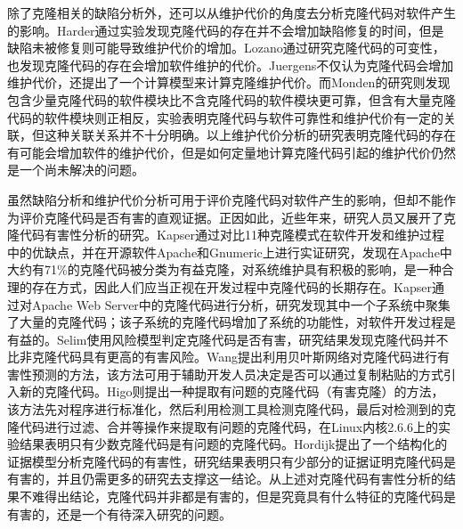 除了克隆相关的缺陷分析外，还可以从维护代价的角度去分析克隆代码对软件产生的影响。Harder通过实验发现克隆代码的存在并不会增加缺陷修复的时间，但是缺陷未被修复则可能导致维护代价的增加\cite{harder2012controlled}。Lozano通过研究克隆代码的可变性，也发现克隆代码的存在会增加软件维护的代价\cite{lozano2008assessing}。Juergens不仅认为克隆代码会增加维护代价，还提出了一个计算模型来计算克隆维护代价\cite{juergens2010much}。而Monden的研究则发现包含少量克隆代码的软件模块比不含克隆代码的软件模块更可靠，但含有大量克隆代码的软件模块则正相反，实验表明克隆代码与软件可靠性和维护代价有一定的关联，但这种关联关系并不十分明确\cite{monden2002software}。以上维护代价分析的研究表明克隆代码的存在有可能会增加软件的维护代价，但是如何定量地计算克隆代码引起的维护代价仍然是一个尚未解决的问题。

虽然缺陷分析和维护代价分析可用于评价克隆代码对软件产生的影响，但却不能作为评价克隆代码是否有害的直观证据。正因如此，近些年来，研究人员又展开了克隆代码有害性分析的研究。Kapser通过对比11种克隆模式在软件开发和维护过程中的优缺点，并在开源软件Apache和Gnumeric上进行实证研究，发现在Apache中大约有71\%的克隆代码被分类为有益克隆，对系统维护具有积极的影响，是一种合理的存在方式，因此人们应当正视在开发过程中克隆代码的长期存在\cite{kapser2006cloning}\cite{kapser2008cloning}。Kapser通过对Apache Web Server中的克隆代码进行分析，研究发现其中一个子系统中聚集了大量的克隆代码；该子系统的克隆代码增加了系统的功能性，对软件开发过程是有益的\cite{kapser2006supporting}。Selim使用风险模型判定克隆代码是否有害，研究结果发现克隆代码并不比非克隆代码具有更高的有害风险\cite{selim2010studying}。Wang提出利用贝叶斯网络对克隆代码进行有害性预测的方法\cite{wang2012can}，该方法可用于辅助开发人员决定是否可以通过复制粘贴的方式引入新的克隆代码。Higo则提出一种提取有问题的克隆代码（有害克隆）的方法，该方法先对程序进行标准化，然后利用检测工具检测克隆代码，最后对检测到的克隆代码进行过滤、合并等操作来提取有问题的克隆代码，在Linux内核2.6.6上的实验结果表明只有少数克隆代码是有问题的克隆代码\cite{higo2009problematic}。Hordijk提出了一个结构化的证据模型分析克隆代码的有害性，研究结果表明只有少部分的证据证明克隆代码是有害的，并且仍需更多的研究去支撑这一结论\cite{hordijk2009harmfulness}。从上述对克隆代码有害性分析的结果不难得出结论，克隆代码并非都是有害的，但是究竟具有什么特征的克隆代码是有害的，还是一个有待深入研究的问题。

